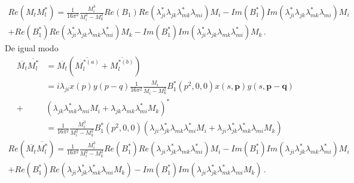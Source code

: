 \begin{align}
Re(M_{t}M^*_{l})=\frac{1}{16\pi^2}
\frac{M_{i}^3}{M_{i}^2-M_{k}^2}Re(B_{1})Re(\lambda^*_{ji}\lambda_{jk}\lambda^*_{mk}\lambda_{mi})M_{i}-Im(B_{1}^*)Im(\lambda^*_{ji}\lambda_{jk}\lambda^*_{mk}\lambda_{mi})M_{i}\nonumber \\+Re(B_{1}^*)Re(\lambda^*_{ji}\lambda_{jk}\lambda_{mk}\lambda^*_{mi})M_{k}- Im(B_{1}^*)Im(\lambda^*_{ji}\lambda_{jk}\lambda_{mk}\lambda^*_{mi})M_{k}\, . 
\end{align}
De igual modo
\begin{align}
\overline{M_{t}}\overline{M^*_{l}}&=\overline{M_{t}}(\overline{M^{*(a)}_{l}}+\overline{M^{*(b)}_{l}})\\
&=i\lambda_{ji}x(p)y(p-q)\frac{1}{16\pi^2}
\frac{M_{i}}{M_{i}-M_{k}^2}B_{1}^*(p^2,0,0)x(s,\boldsymbol{p})y(s,\boldsymbol{p-q})\\ \nonumber+&
(\lambda_{jk}\lambda^*_{mk}\lambda_{mi}M_{i}+\lambda_{jk}\lambda_{mk}\lambda^*_{mi}M_{k})^*\\ \nonumber &
=\frac{1}{16\pi^2}
\frac{M_{i}^3}{M_{i}^2-M_{k}^2}B_{1}^*(p^2,0,0)(\lambda_{ji}\lambda^*_{jk}\lambda_{mk}\lambda^*_{mi}M_{i}+\lambda_{ji}\lambda^*_{jk}\lambda^*_{mk}\lambda_{mi}M_{k})
\end{align}
\begin{align}
Re(\overline{M_{t}}\overline{M^*_{l}})=\frac{1}{16\pi^2}
\frac{M_{i}^3}{M_{i}^2-M_{k}^2}Re(B_{1}^*)Re(\lambda_{ji}\lambda^*_{jk}\lambda_{mk}\lambda^*_{mi})M_{i}-Im(B_{1}^*)Im(\lambda_{ji}\lambda^*_{jk}\lambda_{mk}\lambda^*_{mi})M_{i} \nonumber\\+Re(B_{1}^*)Re(\lambda_{ji}\lambda^*_{jk}\lambda^*_{mk}\lambda_{mi}M_{k})-Im(B_{1}^*)Im(\lambda_{ji}\lambda^*_{jk}\lambda^*_{mk}\lambda_{mi}M_{k})\, .
\end{align}


